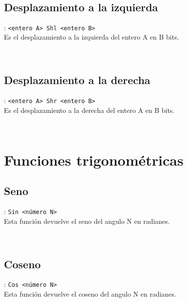       \begin{fxcode}
         \\
      \end{fxcode}
      
      \subsection*{Desplazamiento a la izquierda}: \texttt{<entero A>~Shl <entero B>}\\
      Es el desplazamiento a la izquierda del entero A en B bits.
      
      \begin{fxcode}
         \\
      \end{fxcode}
      
      \subsection*{Desplazamiento a la derecha}: \texttt{<entero A>~Shr <entero B>}\\
      Es el desplazamiento a la derecha del entero A en B bits.
      
      \begin{fxcode}
         \\
      \end{fxcode}
      
   \section{Funciones trigonométricas}
      
      \subsection*{Seno}: \texttt{Sin <número N>}\\
      Esta función devuelve el seno del angulo N en radianes.
      
      \begin{fxcode}
         \\
      \end{fxcode}
      
      \subsection*{Coseno}: \texttt{Cos <número N>}\\
      Esta función devuelve el coseno del angulo N en radianes.
      
